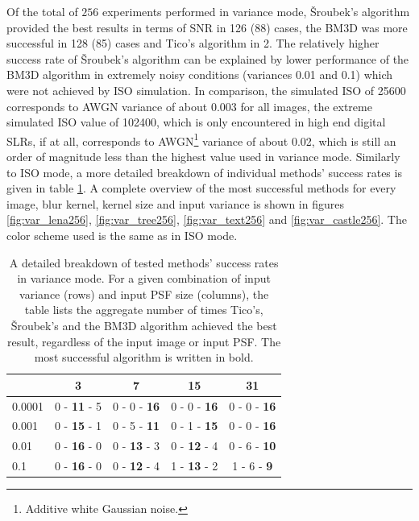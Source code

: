 \documentclass[12pt,notitlepage]{report}
\begin{document}
Of the total of $256$ experiments performed in variance mode, Šroubek's algorithm provided the best results in terms of SNR in 126 (88) cases, the BM3D was more successful in 128 (85) cases and Tico's algorithm in 2. The relatively higher success rate of Šroubek's algorithm can be explained by lower performance of the BM3D algorithm in extremely noisy conditions (variances 0.01 and 0.1) which were not achieved by ISO simulation. In comparison, the simulated ISO of 25600 corresponds to AWGN variance of about 0.003 for all images, the extreme simulated ISO value of 102400, which is only encountered in high end digital SLRs, if at all, corresponds to AWGN\footnote[6]{Additive white Gaussian noise.} variance of about 0.02, which is still an order of magnitude less than the highest value used in variance mode. Similarly to ISO mode, a more detailed breakdown of individual methods' success rates is given in table \ref{tab:var_mode_breakdown}. A complete overview of the most successful methods for every image, blur kernel, kernel size and input variance is shown in figures \ref{fig:var_lena256}, \ref{fig:var_tree256}, \ref{fig:var_text256} and \ref{fig:var_castle256}. The color scheme used is the same as in ISO mode.

\begin{table}[h]
  \centering
  \begin{tabular}{ | l | c | c | c | c |}
    \hline
		   & 3 & 7 & 15 & 31 \\ \hline
	0.0001 & 0 - \textbf{11} - 5 & 0 - 0 - \textbf{16} & 0 - 0 - \textbf{16} & 0 - 0 - \textbf{16} \\ \hline
	0.001  & 0 - \textbf{15} - 1 & 0 - 5 - \textbf{11} & 0 - 1 - \textbf{15} & 0 - 0 - \textbf{16} \\ \hline
	0.01   & 0 - \textbf{16} - 0 & 0 - \textbf{13} - 3 & 0 - \textbf{12} - 4 & 0 - 6 - \textbf{10} \\ \hline
	0.1    & 0 - \textbf{16} - 0 & 0 - \textbf{12} - 4 & 1 - \textbf{13} - 2 & 1 - 6 - \textbf{9} \\ \hline
  \end{tabular}
  \caption[A detailed breakdown of tested methods' success rates in variance mode]{A detailed breakdown of tested methods' success rates in variance mode. For a given combination of input variance (rows) and input PSF size (columns), the table lists the aggregate number of times Tico's, Šroubek's and the BM3D algorithm achieved the best result, regardless of the input image or input PSF. The most successful algorithm is written in bold.}
  \label{tab:var_mode_breakdown}
\end{table}
\end{document}
